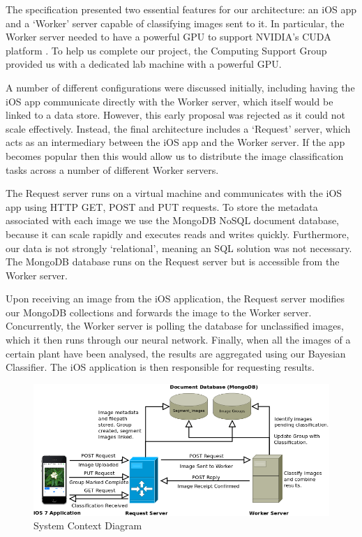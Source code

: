 \documentclass[a4paper,11pt]{article}
\begin{document}
The specification presented two essential features for our architecture: an iOS app and a `Worker' server capable of classifying images sent to it. In particular, the Worker server needed to have a powerful GPU to support NVIDIA's CUDA platform \cite{nvidiacuda}. To help us complete our project, the Computing Support Group provided us with a dedicated lab machine with a powerful GPU.

A number of different configurations were discussed initially, including having the iOS app communicate directly with the Worker server, which itself would be linked to a data store. However, this early proposal was rejected as it could not scale effectively. Instead, the final architecture includes a `Request' server, which acts as an intermediary between the iOS app and the Worker server. If the app becomes popular then this would allow us to distribute the image classification tasks across a number of different Worker servers. 

The Request server runs on a virtual machine and communicates with the iOS app using HTTP GET, POST and PUT requests. To store the metadata associated with each image we use the MongoDB NoSQL document database, because it can scale rapidly and executes reads and writes quickly. Furthermore, our data is not strongly `relational', meaning an SQL solution was not necessary. The MongoDB database runs on the Request server but is accessible from the Worker server. 

Upon receiving an image from the iOS application, the Request server modifies our MongoDB collections and forwards the image to the Worker server. Concurrently, the Worker server is polling the database for unclassified images, which it then runs through our neural network. Finally, when all the images of a certain plant have been analysed, the results are aggregated using our Bayesian Classifier. The iOS application is then responsible for requesting results.


\begin{figure}[h!]
  \centering
  \includegraphics[width=1\linewidth]{SystemContextDiagram.png}
  \caption{System Context Diagram}
  \label{fig:systemcontextdiagram}
\end{figure}
\end{document}
